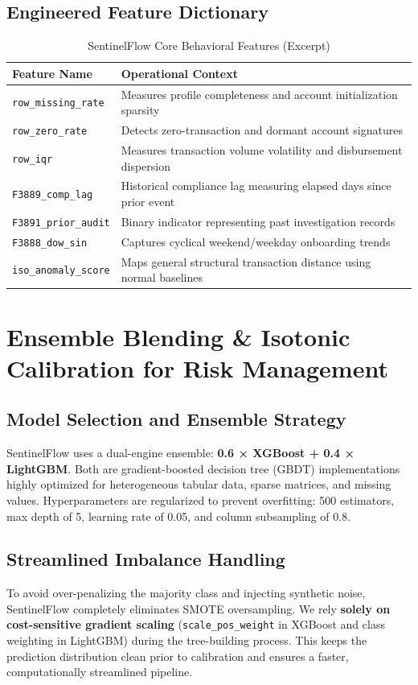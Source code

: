 \documentclass[11pt,a4paper]{article}
\begin{document}
\subsection*{Engineered Feature Dictionary}
\begin{table}[H]
\centering
\caption{SentinelFlow Core Behavioral Features (Excerpt)}\label{tab:behavioral_features}
\begin{tabular}{p{4cm}p{8cm}}
\toprule
\textbf{Feature Name} & \textbf{Operational Context} \\
\midrule
\texttt{row\_missing\_rate} & Measures profile completeness and account initialization sparsity \\
\texttt{row\_zero\_rate} & Detects zero-transaction and dormant account signatures \\
\texttt{row\_iqr} & Measures transaction volume volatility and disbursement dispersion \\
\texttt{F3889\_comp\_lag} & Historical compliance lag measuring elapsed days since prior event \\
\texttt{F3891\_prior\_audit} & Binary indicator representing past investigation records \\
\texttt{F3888\_dow\_sin} & Captures cyclical weekend/weekday onboarding trends \\
\texttt{iso\_anomaly\_score} & Maps general structural transaction distance using normal baselines \\
\bottomrule
\end{tabular}
\end{table}

\section{Ensemble Blending \& Isotonic Calibration for Risk Management}
\subsection*{Model Selection and Ensemble Strategy}
SentinelFlow uses a dual-engine ensemble: \textbf{0.6 × XGBoost + 0.4 × LightGBM}. Both are gradient-boosted decision tree (GBDT) implementations highly optimized for heterogeneous tabular data, sparse matrices, and missing values. Hyperparameters are regularized to prevent overfitting: 500 estimators, max depth of 5, learning rate of 0.05, and column subsampling of 0.8.

\subsection*{Streamlined Imbalance Handling}
To avoid over-penalizing the majority class and injecting synthetic noise, SentinelFlow completely eliminates SMOTE oversampling. We rely \textbf{solely on cost-sensitive gradient scaling} (\texttt{scale\_pos\_weight} in XGBoost and class weighting in LightGBM) during the tree-building process. This keeps the prediction distribution clean prior to calibration and ensures a faster, computationally streamlined pipeline.
\end{document}
